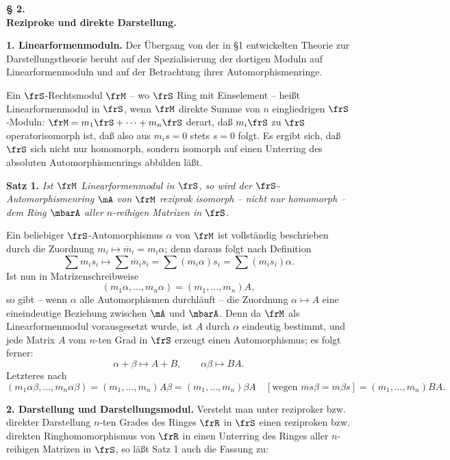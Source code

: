 \begin{center}
\textbf{§ 2.}\\[0.4em]
\textbf{Reziproke und direkte Darstellung.}
\end{center}

\noindent\textbf{1. Linearformenmoduln.} Der Übergang von der in §1 entwickelten Theorie zur Darstellungstheorie beruht auf der Spezialisierung der dortigen Moduln auf Linearformenmoduln und auf der Betrachtung ihrer Automorphismenringe.

Ein \(\frS\)-Rechtsmodul \(\frM\) -- wo \(\frS\) Ring mit Einselement -- heißt Linearformenmodul in \(\frS\), wenn \(\frM\) direkte Summe von \(n\) eingliedrigen \(\frS\)-Moduln: \(\frM=m_1\frS+\cdots+m_n\frS\) derart, daß \(m_i\frS\) zu \(\frS\) operatorisomorph ist, daß also aus \(m_i s=0\) stets \(s=0\) folgt. Es ergibt sich, daß \(\frS\) sich nicht nur homomorph, sondern isomorph auf einen Unterring des absoluten Automorphismenrings abbilden läßt.

\noindent\textbf{Satz 1.} \emph{Ist \(\frM\) Linearformenmodul in \(\frS\), so wird der \(\frS\)-Automorphismenring \(\mA\) von \(\frM\) reziprok isomorph -- nicht nur homomorph -- dem Ring \(\mbarA\) aller \(n\)-reihigen Matrizen in \(\frS\).}

Ein beliebiger \(\frS\)-Automorphismus \(\alpha\) von \(\frM\) ist vollständig beschrieben durch die Zuordnung \(m_i\longmapsto \overline m_i=m_i\alpha\); denn daraus folgt nach Definition
\[
        \sum m_i s_i\longmapsto
        \sum \overline m_i s_i
        =\sum (m_i\alpha)s_i
        =\sum (m_i s_i)\alpha.
\]
Ist nun in Matrizenschreibweise
\[
        (m_1\alpha,\ldots,m_n\alpha)=(m_1,\ldots,m_n)A,
\]
so gibt -- wenn \(\alpha\) alle Automorphismen durchläuft -- die Zuordnung \(\alpha\mapsto A\) eine eineindeutige Beziehung zwischen \(\mA\) und \(\mbarA\). Denn da \(\frM\) als Linearformenmodul vorausgesetzt wurde, ist \(A\) durch \(\alpha\) eindeutig bestimmt, und jede Matrix \(A\) vom \(n\)-ten Grad in \(\frS\) erzeugt einen Automorphismus; es folgt ferner:
\[
        \alpha+\beta\mapsto A+B,\qquad
        \alpha\beta\mapsto BA.
\]
Letzteres nach
\[
        (m_1\alpha\beta,\ldots,m_n\alpha\beta)
        =(m_1,\ldots,m_n)A\beta
        =(m_1,\ldots,m_n)\beta A
        \quad[\text{wegen }m s\beta=m\beta s]
        =(m_1,\ldots,m_n)BA.
\]

\noindent\textbf{2. Darstellung und Darstellungsmodul.} Versteht man unter reziproker bzw. direkter Darstellung \(n\)-ten Grades des Ringes \(\frR\) in \(\frS\) einen reziproken bzw. direkten Ringhomomorphismus von \(\frR\) in einen Unterring des Ringes aller \(n\)-reihigen Matrizen in \(\frS\), so läßt Satz 1 auch die Fassung zu:

